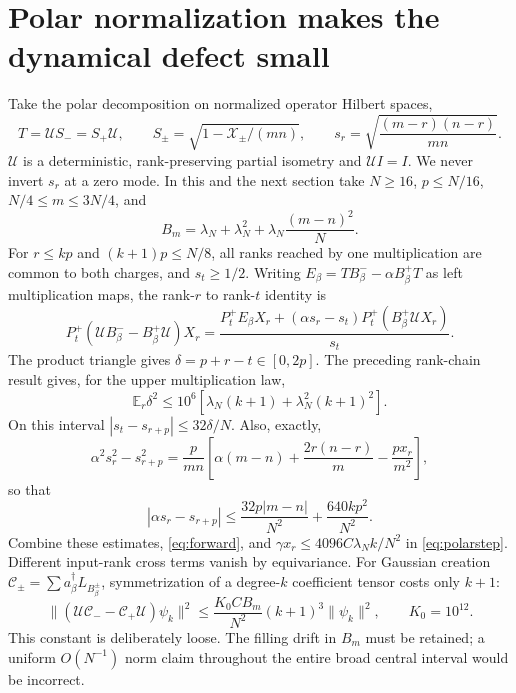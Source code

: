 \documentclass[11pt,a4paper]{article}
\newcommand{\EE}{\mathbb E}
\newcommand{\XX}{\mathcal X}
\begin{document}
\newpage
\section{Polar normalization makes the dynamical defect small}
Take the polar decomposition on normalized operator Hilbert spaces,
\begin{equation}
 T=\mathcal U S_-=S_+\mathcal U,\qquad
 S_\pm=\sqrt{1-\XX_\pm/(mn)},\qquad
 s_r=\sqrt{\frac{(m-r)(n-r)}{mn}}.
\end{equation}
$\mathcal U$ is a deterministic, rank-preserving partial isometry
and $\mathcal U I=I$. We never invert $s_r$ at a zero mode.
In this and the next section take $N\ge16$, $p\le N/16$,
$N/4\le m\le3N/4$, and
\begin{equation}
 B_m=\lambda_N+\lambda_N^2+
       \lambda_N\frac{(m-n)^2}{N}.
\end{equation}
For $r\le kp$ and $(k+1)p\le N/8$, all ranks reached by one
multiplication are common to both charges, and $s_t\ge1/2$.
Writing $E_\beta=TB_\beta^- -\alpha B_\beta^+T$ as left
multiplication maps, the rank-$r$ to rank-$t$ identity is
\begin{equation}
 P_t^+(\mathcal U B_\beta^- -B_\beta^+\mathcal U)X_r
 =\frac{P_t^+E_\beta X_r
       +(\alpha s_r-s_t)P_t^+(B_\beta^+\mathcal U X_r)}{s_t}.
 \label{eq:polarstep}
\end{equation}
The product triangle gives $\delta=p+r-t\in[0,2p]$. The preceding
rank-chain result gives, for the upper multiplication law,
\begin{equation}
 \EE_r\delta^2\le10^6[\lambda_N(k+1)+\lambda_N^2(k+1)^2].
\end{equation}
On this interval $|s_t-s_{r+p}|\le32\delta/N$. Also, exactly,
\begin{equation}
 \alpha^2s_r^2-s_{r+p}^2
 =\frac{p}{mn}\left[\alpha(m-n)+\frac{2r(n-r)}m
                                      -\frac{p x_r}{m^2}\right],
\end{equation}
so that
\begin{equation}
 |\alpha s_r-s_{r+p}|
 \le\frac{32p|m-n|}{N^2}+\frac{640kp^2}{N^2}.
\end{equation}
Combine these estimates, \eqref{eq:forward}, and
$\gamma x_r\le4096C\lambda_N k/N^2$ in \eqref{eq:polarstep}.
Different input-rank cross terms vanish by equivariance. For Gaussian
creation $\mathcal C_\pm=\sum a_\beta^\dagger L_{B_\beta^\pm}$,
symmetrization of a degree-$k$ coefficient tensor costs only $k+1$:
\begin{equation}
 \|(\mathcal U\mathcal C_- -\mathcal C_+\mathcal U)\psi_k\|^2
 \le\frac{K_0 C B_m}{N^2}(k+1)^3\|\psi_k\|^2,
 \qquad K_0=10^{12}.
 \label{eq:creation}
\end{equation}
This constant is deliberately loose. The filling drift in $B_m$
must be retained; a uniform $O(N^{-1})$ norm claim throughout the
entire broad central interval would be incorrect.
\end{document}
